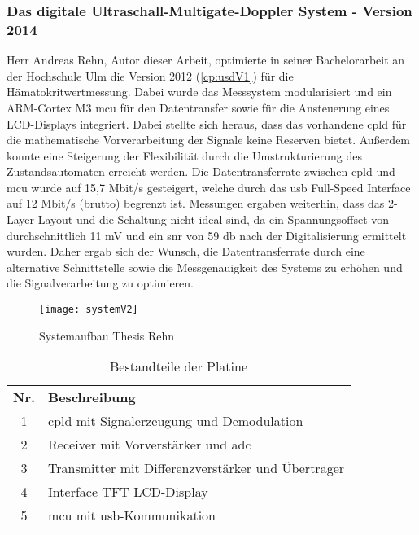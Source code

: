 \subsubsection*{Das digitale Ultraschall-Multigate-Doppler System - Version 2014}\label{cp:usdV2}
Herr Andreas Rehn, Autor dieser Arbeit, optimierte in seiner Bachelorarbeit an der Hochschule Ulm die Version 2012 (\autoref{cp:usdV1}) für die Hämatokritwertmessung. Dabei wurde das Messsystem modularisiert und ein ARM-Cortex M3 \ac{mcu} für den Datentransfer sowie für die Ansteuerung eines LCD-Displays integriert. Dabei stellte sich heraus, dass das vorhandene \ac{cpld} für die mathematische Vorverarbeitung der Signale keine Reserven bietet. Außerdem konnte eine Steigerung der Flexibilität durch die Umstrukturierung des Zustandsautomaten erreicht werden. Die Datentransferrate zwischen \ac{cpld} und \ac{mcu} wurde auf 15,7 Mbit/s gesteigert, welche durch das \ac{usb} Full-Speed Interface auf 12 Mbit/s (brutto) begrenzt ist. Messungen ergaben weiterhin, dass das 2-Layer Layout und die Schaltung nicht ideal sind, da ein Spannungsoffset von durchschnittlich 11 mV und ein \ac{snr} von 59 \ac{db} nach der Digitalisierung ermittelt wurden. Daher ergab sich der Wunsch, die Datentransferrate durch eine alternative Schnittstelle sowie die Messgenauigkeit des Systems zu erhöhen und die Signalverarbeitung zu optimieren.\cite{rehn2014}

\begin{figure}[h]
\centering
  	\texttt{[image: systemV2]}  
	\caption{Systemaufbau Thesis Rehn}
  	\label{fig:system_stemp}
\end{figure}
\begin{table}[h]
\centering
\caption{Bestandteile der Platine}
\label{tab:system_stemp_tab}
\begin{tabular}{c|l}
\textbf{Nr.} & \textbf{Beschreibung} \\
\cline{1-2}
1 & \ac{cpld} mit Signalerzeugung und Demodulation\\ 
2 & Receiver mit Vorverstärker und \ac{adc}\\
3 & Transmitter mit Differenzverstärker und Übertrager\\
4 & Interface TFT LCD-Display\\
5 & \ac{mcu} mit \ac{usb}-Kommunikation\\
\end{tabular}
\end{table}
%
%
%
\newpage
